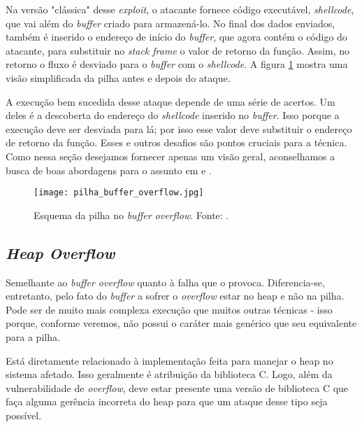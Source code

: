 			
			Na versão "clássica" desse \textsl{exploit}, o atacante fornece
			código executável, \textsl{shellcode}, que vai além do \textsl{buffer} criado para
			armazená-lo. No final dos dados enviados, também é inserido o endereço de início
			do \textsl{buffer}, que agora contém o código do atacante, para substituir no
			\textsl{stack frame} o valor de retorno da função. Assim, no retorno o fluxo
			é desviado para o \textsl{buffer} com o \textsl{shellcode}. A figura 
			\ref{fig:pilha_buffer_overflow} mostra uma visão simplificada da pilha
			antes e depois do ataque. 


			A execução bem sucedida desse ataque depende de uma série de acertos.
			Um deles é a descoberta do endereço do \textsl{shellcode} inserido no \textsl{buffer}.
			Isso porque a execução deve ser desviada para lá; por isso esse valor
			deve substituir o endereço de retorno da função. Esses e outros desafios são pontos
			cruciais para a técnica. Como nessa seção desejamos fornecer apenas um visão geral,
			aconselhamos a busca de boas abordagens para o assunto em \cite{Anley2007} e \cite{Furlan2005}. 


			\begin{figure}
				\begin{center}
					\texttt{[image: pilha\_buffer\_overflow.jpg]}
					\caption{Esquema da pilha no \textsl{buffer overflow}. Fonte: \cite{Martins2009}.}
					\label{fig:pilha_buffer_overflow}
				\end{center}
			\end{figure}

		\subsection{\textsl{Heap Overflow}}
			Semelhante ao \textsl{buffer overflow} quanto à falha que o provoca.
			Diferencia-se, entretanto, pelo fato do \textsl{buffer} a sofrer o \textsl{overflow}
			estar no heap e não na pilha. Pode ser de muito mais complexa execução que
			muitos outras técnicas - isso porque, conforme veremos, não possui o caráter
			mais genérico que seu equivalente para a pilha.
			
			
			Está diretamente relacionado à implementação feita para manejar o heap no sistema
			afetado. Isso geralmente é atribuição da biblioteca C. Logo, além da vulnerabilidade
			de \textsl{overflow}, deve estar presente uma versão de biblioteca C que faça alguma
			gerência incorreta do heap para que um ataque desse tipo seja possível.

